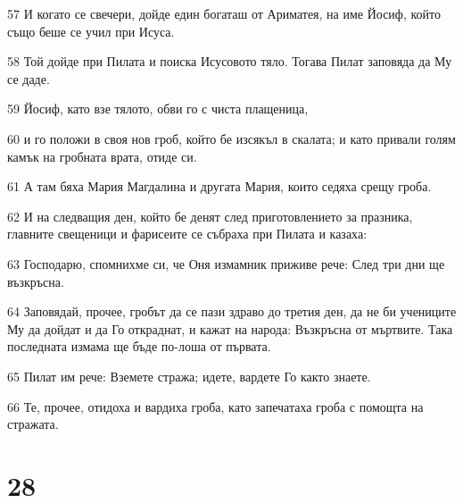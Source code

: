 \par 57 И когато се свечери, дойде един богаташ от Ариматея, на име Йосиф, който също беше се учил при Исуса.
\par 58 Той дойде при Пилата и поиска Исусовото тяло. Тогава Пилат заповяда да Му се даде.
\par 59 Йосиф, като взе тялото, обви го с чиста плащеница,
\par 60 и го положи в своя нов гроб, който бе изсякъл в скалата; и като привали голям камък на гробната врата, отиде си.
\par 61 А там бяха Мария Магдалина и другата Мария, които седяха срещу гроба.
\par 62 И на следващия ден, който бе денят след приготовлението за празника, главните свещеници и фарисеите се събраха при Пилата и казаха:
\par 63 Господарю, спомнихме си, че Оня измамник приживе рече: След три дни ще възкръсна.
\par 64 Заповядай, прочее, гробът да се пази здраво до третия ден, да не би учениците Му да дойдат и да Го откраднат, и кажат на народа: Възкръсна от мъртвите. Така последната измама ще бъде по-лоша от първата.
\par 65 Пилат им рече: Вземете стража; идете, вардете Го както знаете.
\par 66 Те, прочее, отидоха и вардиха гроба, като запечатаха гроба с помощта на стражата.

\chapter{28}

